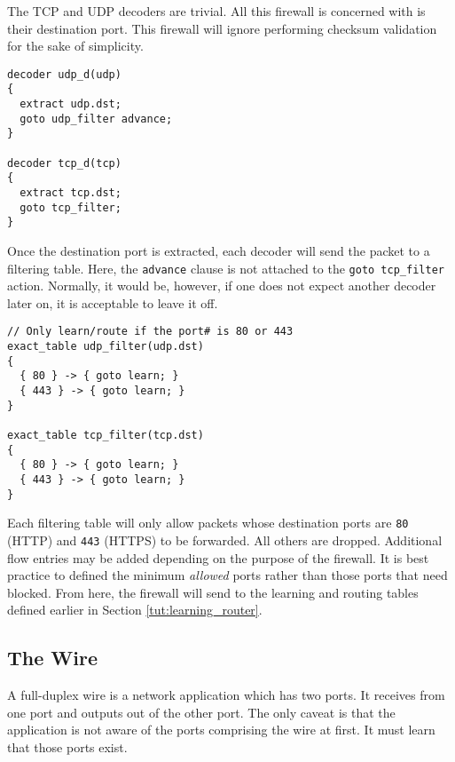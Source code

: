 The TCP and UDP decoders are trivial. All this firewall is concerned with is their destination port. This firewall will ignore performing checksum validation for the sake of simplicity. 

\begin{codepage}
\begin{lstlisting}
decoder udp_d(udp)
{
  extract udp.dst;
  goto udp_filter advance;
}

decoder tcp_d(tcp)
{
  extract tcp.dst;
  goto tcp_filter;
}
\end{lstlisting}
\end{codepage}

Once the destination port is extracted, each decoder will send the packet to 
a filtering table. Here, the \texttt{advance} clause is not attached to the 
\texttt{goto tcp\_filter} action. Normally, it would be, however, if one does 
not expect another decoder later on, it is acceptable to leave it off.

\begin{codepage}
\begin{lstlisting}
// Only learn/route if the port# is 80 or 443
exact_table udp_filter(udp.dst)
{
  { 80 } -> { goto learn; }
  { 443 } -> { goto learn; }
}

exact_table tcp_filter(tcp.dst)
{
  { 80 } -> { goto learn; }
  { 443 } -> { goto learn; }
}
\end{lstlisting}
\end{codepage}

Each filtering table will only allow packets whose destination ports are \texttt{80} (HTTP) and \texttt{443} (HTTPS) to be forwarded. All others are dropped. Additional flow entries may be added depending on the purpose of the firewall. It is best practice to defined the minimum \textit{allowed} ports rather than those ports that need blocked. From here, the firewall will send to the learning and routing tables defined earlier in Section \ref{tut:learning_router}.

\subsection{The Wire} \label{tut:wire}

A full-duplex wire is a network application which has two ports. It receives from one port
and outputs out of the other port. The only caveat is that the application is
not aware of the ports comprising the wire at first. It must learn that those
ports exist.

